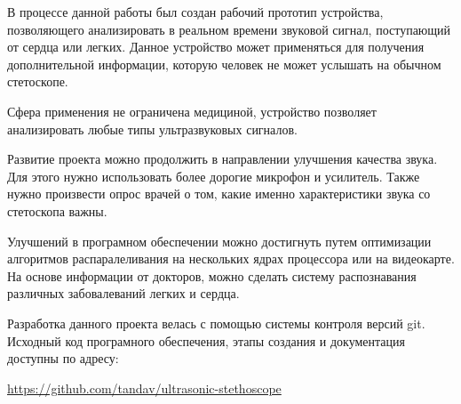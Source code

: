 \documentclass[../paper.tex]{subfiles}
\begin{document}
В процессе данной работы был создан рабочий прототип устройства, позволяющего анализировать в реальном времени звуковой сигнал, поступающий от сердца или легких. Данное устройство может применяться для получения дополнительной информации, которую человек не может услышать на обычном стетоскопе.

Сфера применения не ограничена медициной, устройство позволяет анализировать любые типы ультразвуковых сигналов.

Развитие проекта можно продолжить в направлении улучшения качества звука. Для этого нужно использовать более дорогие микрофон и усилитель. Также нужно произвести опрос врачей о том, какие именно характеристики звука со стетоскопа важны.

Улучшений в програмном обеспечении можно достигнуть путем оптимизации алгоритмов распаралеливания на нескольких ядрах процессора или на видеокарте. На основе информации от докторов, можно сделать систему распознавания различных забовалеваний легких и сердца.

Разработка данного проекта велась с помощью системы контроля версий git. Исходный код програмного обеспечения, этапы создания и документация доступны по адресу:

\url{https://github.com/tandav/ultrasonic-stethoscope}
\end{document}
